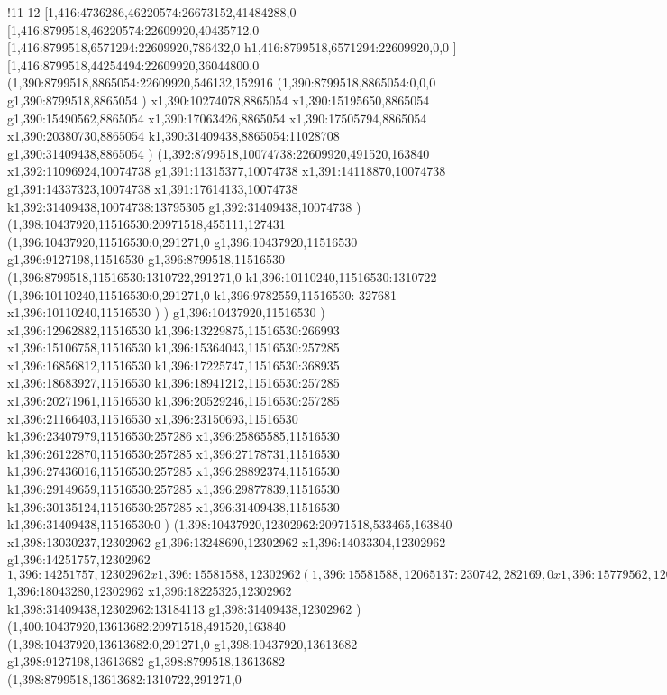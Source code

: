 !11
{12
[1,416:4736286,46220574:26673152,41484288,0
[1,416:8799518,46220574:22609920,40435712,0
[1,416:8799518,6571294:22609920,786432,0
h1,416:8799518,6571294:22609920,0,0
]
[1,416:8799518,44254494:22609920,36044800,0
(1,390:8799518,8865054:22609920,546132,152916
(1,390:8799518,8865054:0,0,0
g1,390:8799518,8865054
)
x1,390:10274078,8865054
x1,390:15195650,8865054
g1,390:15490562,8865054
x1,390:17063426,8865054
x1,390:17505794,8865054
x1,390:20380730,8865054
k1,390:31409438,8865054:11028708
g1,390:31409438,8865054
)
(1,392:8799518,10074738:22609920,491520,163840
x1,392:11096924,10074738
g1,391:11315377,10074738
x1,391:14118870,10074738
g1,391:14337323,10074738
x1,391:17614133,10074738
k1,392:31409438,10074738:13795305
g1,392:31409438,10074738
)
(1,398:10437920,11516530:20971518,455111,127431
(1,396:10437920,11516530:0,291271,0
g1,396:10437920,11516530
g1,396:9127198,11516530
g1,396:8799518,11516530
(1,396:8799518,11516530:1310722,291271,0
k1,396:10110240,11516530:1310722
(1,396:10110240,11516530:0,291271,0
k1,396:9782559,11516530:-327681
x1,396:10110240,11516530
)
)
g1,396:10437920,11516530
)
x1,396:12962882,11516530
k1,396:13229875,11516530:266993
x1,396:15106758,11516530
k1,396:15364043,11516530:257285
x1,396:16856812,11516530
k1,396:17225747,11516530:368935
x1,396:18683927,11516530
k1,396:18941212,11516530:257285
x1,396:20271961,11516530
k1,396:20529246,11516530:257285
x1,396:21166403,11516530
x1,396:23150693,11516530
k1,396:23407979,11516530:257286
x1,396:25865585,11516530
k1,396:26122870,11516530:257285
x1,396:27178731,11516530
k1,396:27436016,11516530:257285
x1,396:28892374,11516530
k1,396:29149659,11516530:257285
x1,396:29877839,11516530
k1,396:30135124,11516530:257285
x1,396:31409438,11516530
k1,396:31409438,11516530:0
)
(1,398:10437920,12302962:20971518,533465,163840
x1,398:13030237,12302962
g1,396:13248690,12302962
x1,396:14033304,12302962
g1,396:14251757,12302962
$1,396:14251757,12302962
x1,396:15581588,12302962
(1,396:15581588,12065137:230742,282169,0
x1,396:15779562,12065137
)
g1,396:15957962,12302962
x1,396:16467688,12302962
g1,396:16613320,12302962
x1,396:17011085,12302962
(1,396:17011085,12065137:301284,213447,0
x1,396:17279601,12065137
)
x1,396:17567232,12302962
(1,396:17567232,12065137:294003,295640,0
x1,396:17828467,12065137
)
x1,396:18043280,12302962
$1,396:18043280,12302962
x1,396:18225325,12302962
k1,398:31409438,12302962:13184113
g1,398:31409438,12302962
)
(1,400:10437920,13613682:20971518,491520,163840
(1,398:10437920,13613682:0,291271,0
g1,398:10437920,13613682
g1,398:9127198,13613682
g1,398:8799518,13613682
(1,398:8799518,13613682:1310722,291271,0
}
